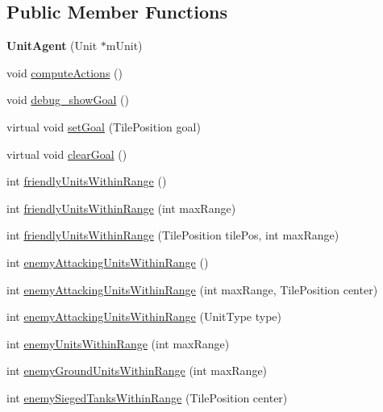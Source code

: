 \subsection*{Public Member Functions}
\begin{DoxyCompactItemize}
\item 
\hypertarget{class_unit_agent_a4ae65a0722a5f349561f5bca20071962}{{\bfseries Unit\-Agent} (Unit $\ast$m\-Unit)}\label{class_unit_agent_a4ae65a0722a5f349561f5bca20071962}

\item 
void \hyperlink{class_unit_agent_aecfbb299e0aed1fe456247cedb3f1660}{compute\-Actions} ()
\item 
void \hyperlink{class_unit_agent_a13d53899455072fd7140df774e3ad450}{debug\-\_\-show\-Goal} ()
\item 
virtual void \hyperlink{class_unit_agent_a202b37248a06875dd72ccde429db1a20}{set\-Goal} (Tile\-Position goal)
\item 
virtual void \hyperlink{class_unit_agent_a5968219c503d74d9649e39a2166ec7ea}{clear\-Goal} ()
\item 
int \hyperlink{class_unit_agent_a53f111ab9bfef5497fb2a923a57c56cf}{friendly\-Units\-Within\-Range} ()
\item 
int \hyperlink{class_unit_agent_a0538e6cba0460436cd497990bfc3c2d4}{friendly\-Units\-Within\-Range} (int max\-Range)
\item 
int \hyperlink{class_unit_agent_a54e017a10b9b0f046718a2dae79223e0}{friendly\-Units\-Within\-Range} (Tile\-Position tile\-Pos, int max\-Range)
\item 
int \hyperlink{class_unit_agent_acd9df77dd79425d27a7b06f9db894c7d}{enemy\-Attacking\-Units\-Within\-Range} ()
\item 
int \hyperlink{class_unit_agent_a4370e0b574d5c5b8b4b89793f96ba13b}{enemy\-Attacking\-Units\-Within\-Range} (int max\-Range, Tile\-Position center)
\item 
int \hyperlink{class_unit_agent_a3cc3afaa78da33b7007dd91de7573f65}{enemy\-Attacking\-Units\-Within\-Range} (Unit\-Type type)
\item 
int \hyperlink{class_unit_agent_a6b153e1ede289efe7958f303e36f8ded}{enemy\-Units\-Within\-Range} (int max\-Range)
\item 
int \hyperlink{class_unit_agent_a2009dc076ff506b47b10b80eecc738e8}{enemy\-Ground\-Units\-Within\-Range} (int max\-Range)
\item 
int \hyperlink{class_unit_agent_a59016a9d4949c8989da3d0047b3419a9}{enemy\-Sieged\-Tanks\-Within\-Range} (Tile\-Position center)

\end{DoxyCompactItemize}
